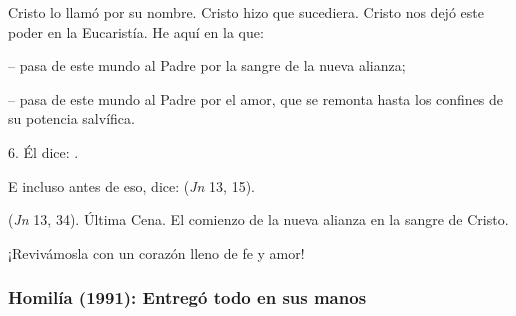 \begin{body}
Cristo lo llamó por su nombre. Cristo hizo que sucediera. Cristo nos dejó este poder en la Eucaristía. He aquí  en la que: 

-- pasa de este mundo al Padre por la sangre de la nueva alianza; 

-- pasa de este mundo al Padre por el amor, que se remonta hasta los confines de su potencia salvífica.

6. Él dice: . 

E incluso antes de eso, dice:  (\textit{Jn} 13, 15). 

 (\textit{Jn} 13, 34). Última Cena. El comienzo de la nueva alianza en la sangre de Cristo. 

¡Revivámosla con un corazón lleno de fe y amor!
\end{body}

\label{b-05-01-1988H}
\newpage

\subsubsection{Homilía (1991): Entregó todo en sus manos}


